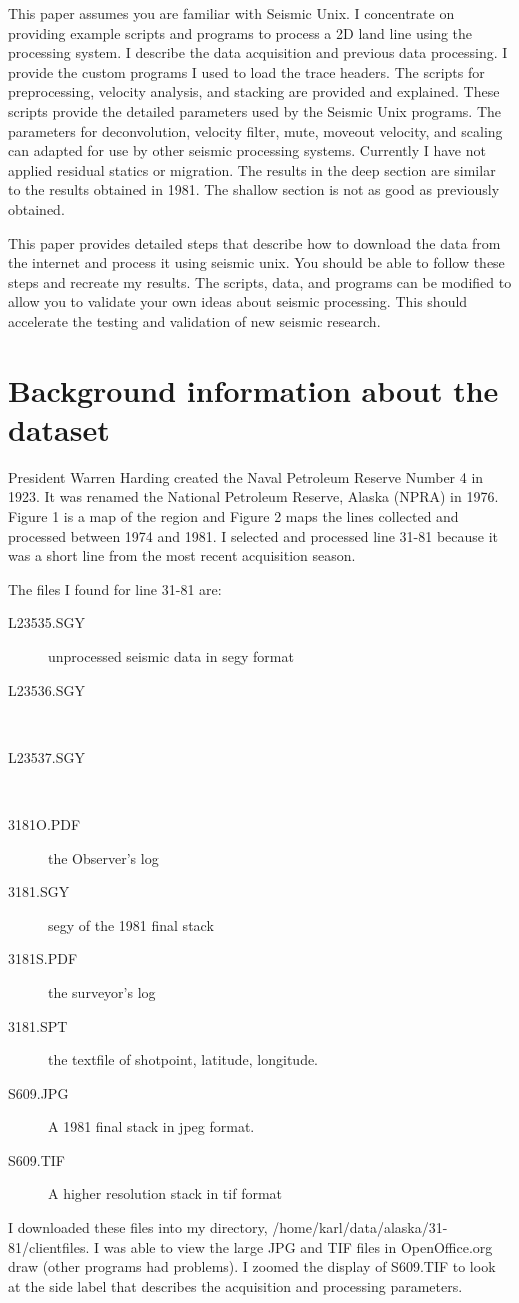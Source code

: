 This paper assumes you are familiar with Seismic Unix.  I concentrate
on providing example scripts and programs to process a 2D land line
using the processing system. I describe the data acquisition and
previous data processing.  I provide the custom programs I used to
load the trace headers.  The scripts for preprocessing, velocity
analysis, and stacking are provided and explained.  These scripts
provide the detailed parameters used by the Seismic Unix programs.
The parameters for deconvolution, velocity filter, mute, moveout
velocity, and scaling can adapted for use by other seismic processing
systems.  Currently I have not applied residual statics or migration.
The results in the deep section are similar to the results obtained in
1981.  The shallow section is not as good as previously obtained.

This paper provides detailed steps that describe how to download the
data from the internet and process it using seismic unix.  You should
be able to follow these steps and recreate my results.  The scripts,
data, and programs can be modified to allow you to validate your own
ideas about seismic processing.  This should accelerate the testing
and validation of new seismic research.

\section{Background information about the dataset}

President Warren Harding created the Naval Petroleum Reserve Number 4
in 1923.  It was renamed the National Petroleum Reserve, Alaska (NPRA)
in 1976.  Figure 1 is a map of the region and Figure 2 maps the lines
collected and processed between 1974 and 1981.  I selected and
processed line 31-81 because it was a short line from the most recent
acquisition season.

The files I found for line 31-81 are: 
\begin{description}
\item[L23535.SGY] unprocessed seismic data in segy format
\item[L23536.SGY] \ 
\item[L23537.SGY] \
\item[3181O.PDF] the Observer's log
\item[3181.SGY] segy of the 1981 final stack
\item[3181S.PDF] the surveyor's log
\item[3181.SPT] the textfile of shotpoint, latitude, longitude. 
\item[S609.JPG]  A 1981 final stack in jpeg format.
\item[S609.TIF]  A higher resolution stack in tif format
\end{description}
I downloaded these files into my directory,
/home/karl/data/alaska/31-81/clientfiles.  I was able to view the
large JPG and TIF files in OpenOffice.org draw (other programs had
problems).  I zoomed the display of S609.TIF to look at the side label
that describes the acquisition and processing parameters.

